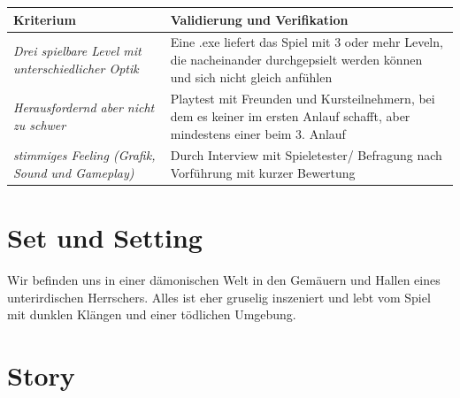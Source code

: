 \documentclass{article}
\begin{document}
   \begin{table}[H]
	\centering
	\begin{tabular}{p{4cm}p{7cm}}
		\textbf{Kriterium}  & \textbf{Validierung und Verifikation} \\
		\hline
		\textit{Drei spielbare Level mit unterschiedlicher Optik}          & \textnormal{Eine .exe liefert das Spiel mit 3 oder mehr Leveln, die nacheinander durchgepsielt werden können und sich nicht gleich anfühlen}            \\
		\hline
		\textit{Herausfordernd aber nicht zu schwer}       & \textnormal{Playtest mit Freunden und Kursteilnehmern, bei dem es keiner im ersten Anlauf schafft, aber mindestens einer beim 3. Anlauf} \\
		\hline
		\textit{stimmiges Feeling (Grafik, Sound und Gameplay)}        & \textnormal{Durch Interview mit Spieletester/ Befragung nach Vorführung mit kurzer Bewertung} \\
	\end{tabular}	
	\label{tbl:ktierien}
	
\end{table}


\vspace{1cm}
\section{Set und Setting}

Wir befinden uns in einer dämonischen Welt in den Gemäuern und Hallen eines unterirdischen Herrschers. Alles ist eher gruselig inszeniert und lebt vom Spiel mit dunklen Klängen und einer tödlichen Umgebung.

\vspace{1cm}
\section{Story}
\end{document}

